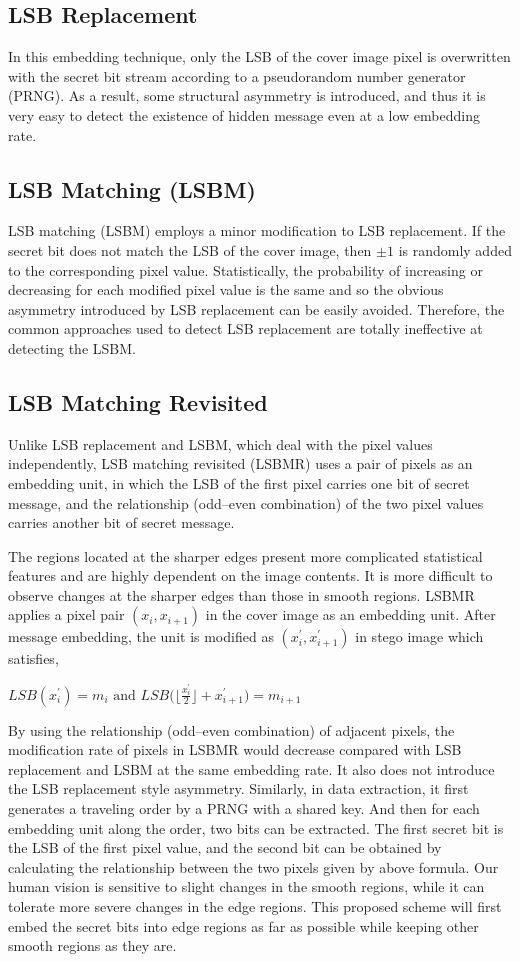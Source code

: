 \documentclass{report}
\begin{document}
\subsection{LSB Replacement}
In this embedding technique, only the LSB of the cover image pixel is overwritten with the secret bit stream according to a pseudorandom number generator (PRNG). As a result, some structural asymmetry is introduced, and thus it is very easy to detect the existence of hidden message even at a low embedding rate.
\subsection{LSB Matching (LSBM)}
LSB matching (LSBM) employs a minor modification to LSB replacement. If the secret bit does not match the LSB of the cover image, then $\pm 1$ is randomly added to the corresponding pixel value. Statistically, the probability of increasing or decreasing for each modified pixel value is the same and so the obvious asymmetry introduced by LSB replacement can be easily avoided. Therefore, the common approaches used to detect LSB replacement are totally ineffective at detecting the LSBM.
\subsection{LSB Matching Revisited}
Unlike LSB replacement and LSBM, which deal with the pixel values independently, LSB matching revisited (LSBMR) uses a pair of pixels as an embedding unit, in which the LSB of the first pixel carries one bit of secret message, and the relationship (odd–even combination) of the two pixel values carries another bit of secret message. \par The regions located at the sharper edges present more complicated statistical features and are highly dependent on the image contents. It is more difficult to observe changes at the sharper edges than those in smooth regions. 
\newpage
LSBMR applies a pixel pair $(x_{i}, x_{i+1})$ in the cover image as an embedding unit. After message embedding, the unit is modified as $(x_{i}^{'}, x_{i+1}^{'})$ in stego image which satisfies,
\begin{center}
$ \displaystyle LSB(x_{i}^{'})=m_{i} \textrm{ and } LSB \Big( \Big\lfloor{\frac{x_{i}^{'}}{2}}\Big \rfloor + x_{i+1}^{'} \Big) = m_{i+1}$
\end{center}
By using the relationship (odd–even combination) of adjacent pixels, the modification rate of pixels in LSBMR would decrease compared with LSB replacement and LSBM at the same embedding rate. It also does not introduce the LSB replacement style asymmetry. Similarly, in data extraction, it first generates a traveling order by a PRNG with a shared key. And then for each embedding unit along the order, two bits can be extracted. The first secret bit is the LSB of the first pixel value, and the second bit can be obtained by calculating the relationship between the two pixels given by above formula. Our human vision is sensitive to slight changes in the smooth regions, while it can tolerate more severe changes in the edge regions.
This proposed scheme will first embed the secret bits into edge regions as far as possible while keeping other smooth regions as they are.
\end{document}
